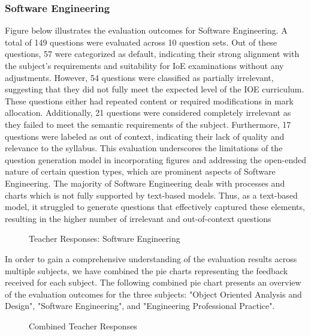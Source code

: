 \documentclass[12pt]{report}
\begin{document}
\subsubsection{Software Engineering}
Figure below illustrates the evaluation outcomes for Software Engineering. A total of 149 questions were evaluated across 10 question sets. Out of these questions, 57 were categorized as default, indicating their strong alignment with the subject's requirements and suitability for IoE examinations without any adjustments. However, 54 questions were classified as partially irrelevant, suggesting that they did not fully meet the expected level of the IOE curriculum. These questions either had repeated content or required modifications in mark allocation. Additionally, 21 questions were considered completely irrelevant as they failed to meet the semantic requirements of the subject. Furthermore, 17 questions were labeled as out of context, indicating their lack of quality and relevance to the syllabus. This evaluation underscores the limitations of the question generation model in incorporating figures and addressing the open-ended nature of certain question types, which are prominent aspects of Software Engineering. The majority of Software Engineering deals with processes and charts which is not fully supported by text-based models. Thus,  as a text-based model, it struggled to generate questions that effectively captured these elements, resulting in the higher number of irrelevant and out-of-context questions
\begin{figure}[!h]
\centering
{}
\caption{Teacher Responses: Software Engineering}
\label{fig:pie_chart}
\end{figure}
\pagebreak

In order to gain a comprehensive understanding of the evaluation results across multiple subjects, we have combined the pie charts representing the feedback received for each subject. The following combined pie chart presents an overview of the evaluation outcomes for the three subjects: "Object Oriented Analysis and Design", "Software Engineering", and "Engineering Professional Practice".
\begin{figure}[!h]
\centering
{}
\caption{Combined Teacher Responses}
\label{fig:pie_chart}
\end{figure}
\pagebreak
\end{document}
